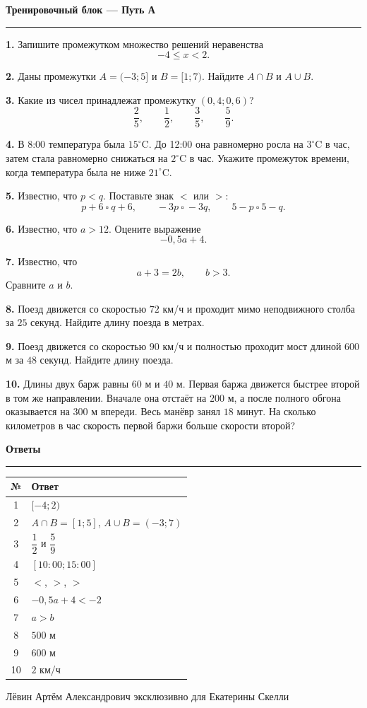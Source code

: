 \documentclass[a4paper,12pt]{article}
\newcommand{\sectiontitle}[1]{%
  \vspace{2mm}%
  {\Large\bfseries\color{darkaccent}#1}\par\vspace{1mm}%
  {\color{linegray}\hrule}\vspace{2mm}%
}
\begin{document}
\clearpage

\sectiontitle{Тренировочный блок --- Путь А}

\textbf{1.} Запишите промежутком множество решений неравенства
\[
-4\le x<2.
\]

\textbf{2.} Даны промежутки $A=(-3;5]$ и $B=[1;7)$. Найдите $A\cap B$ и $A\cup B$.

\textbf{3.} Какие из чисел принадлежат промежутку $(0,4;0,6)$?
\[
\frac25,\qquad \frac12,\qquad \frac35,\qquad \frac59.
\]

\textbf{4.} В 8:00 температура была $15^\circ\!\mathrm{C}$. До 12:00 она равномерно росла на $3^\circ\!\mathrm{C}$ в час, затем стала равномерно снижаться на $2^\circ\!\mathrm{C}$ в час. Укажите промежуток времени, когда температура была не ниже $21^\circ\!\mathrm{C}$.

\textbf{5.} Известно, что $p<q$. Поставьте знак $<$ или $>$:
\[
p+6\ \square\ q+6,\qquad -3p\ \square\ -3q,\qquad 5-p\ \square\ 5-q.
\]

\textbf{6.} Известно, что $a>12$. Оцените выражение
\[
-0,5a+4.
\]

\textbf{7.} Известно, что
\[
a+3=2b,\qquad b>3.
\]
Сравните $a$ и $b$.

\textbf{8.} Поезд движется со скоростью $72$ км/ч и проходит мимо неподвижного столба за $25$ секунд. Найдите длину поезда в метрах.

\textbf{9.} Поезд движется со скоростью $90$ км/ч и полностью проходит мост длиной $600$ м за $48$ секунд. Найдите длину поезда.

\textbf{10.} Длины двух барж равны $60$ м и $40$ м. Первая баржа движется быстрее второй в том же направлении. Вначале она отстаёт на $200$ м, а после полного обгона оказывается на $300$ м впереди. Весь манёвр занял $18$ минут. На сколько километров в час скорость первой баржи больше скорости второй?

\clearpage

\sectiontitle{Ответы}

\begin{center}
\renewcommand{\arraystretch}{1.45}
\begin{tabularx}{0.96\linewidth}{@{}cX@{}}
\toprule
№ & Ответ \\
\midrule
1 & $[-4;2)$ \\
2 & $A\cap B=[1;5]$, \quad $A\cup B=(-3;7)$ \\
3 & $\dfrac12$ и $\dfrac59$ \\
4 & $[10{:}00;15{:}00]$ \\
5 & $<$, $>$, $>$ \\
6 & $-0,5a+4<-2$ \\
7 & $a>b$ \\
8 & $500$ м \\
9 & $600$ м \\
10 & $2$ км/ч \\
\bottomrule
\end{tabularx}
\end{center}

\vfill
{\small\color{softgray}Лёвин Артём Александрович эксклюзивно для Екатерины Скелли}
\end{document}
